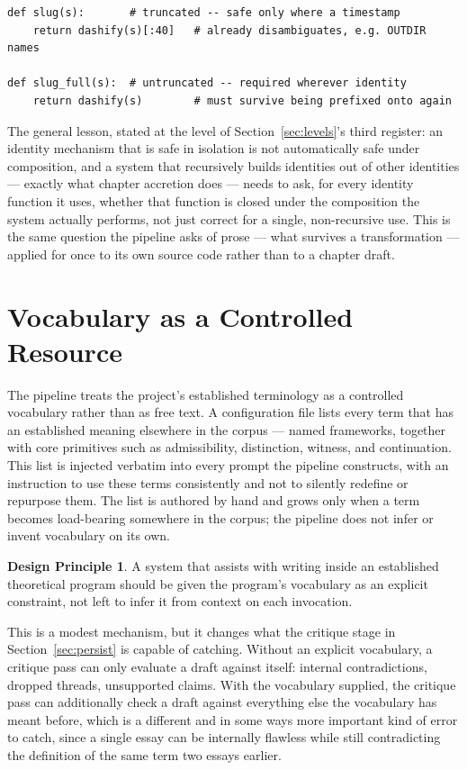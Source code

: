 \documentclass[11pt]{article}
\theoremstyle{definition}
\newtheorem{principle}{Design Principle}
\begin{document}
\begin{lstlisting}[caption={Two identity functions with different survival guarantees}]
def slug(s):       # truncated -- safe only where a timestamp
    return dashify(s)[:40]   # already disambiguates, e.g. OUTDIR names

def slug_full(s):  # untruncated -- required wherever identity
    return dashify(s)        # must survive being prefixed onto again
\end{lstlisting}

The general lesson, stated at the level of Section~\ref{sec:levels}'s
third register: an identity mechanism that is safe in isolation is not
automatically safe under composition, and a system that recursively
builds identities out of other identities --- exactly what chapter
accretion does --- needs to ask, for every identity function it uses,
whether that function is closed under the composition the system
actually performs, not just correct for a single, non-recursive use.
This is the same question the pipeline asks of prose --- what survives
a transformation --- applied for once to its own source code rather
than to a chapter draft.

\section{Vocabulary as a Controlled Resource}
\label{sec:vocab}

The pipeline treats the project's established terminology as a
controlled vocabulary rather than as free text. A configuration file
lists every term that has an established meaning elsewhere in the
corpus --- named frameworks, together with core primitives such as
admissibility, distinction, witness, and continuation. This list is
injected verbatim into every prompt the pipeline constructs, with an
instruction to use these terms consistently and not to silently
redefine or repurpose them. The list is authored by hand and grows only
when a term becomes load-bearing somewhere in the corpus; the pipeline
does not infer or invent vocabulary on its own.

\begin{principle}
A system that assists with writing inside an established theoretical
program should be given the program's vocabulary as an explicit
constraint, not left to infer it from context on each invocation.
\end{principle}

This is a modest mechanism, but it changes what the critique stage in
Section~\ref{sec:persist} is capable of catching. Without an explicit
vocabulary, a critique pass can only evaluate a draft against itself:
internal contradictions, dropped threads, unsupported claims. With the
vocabulary supplied, the critique pass can additionally check a draft
against everything else the vocabulary has meant before, which is a
different and in some ways more important kind of error to catch,
since a single essay can be internally flawless while still
contradicting the definition of the same term two essays earlier.
\end{document}
